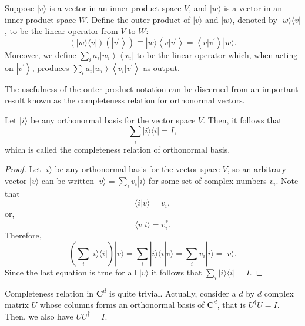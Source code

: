 

Suppose $|v\rangle$ is a vector in an inner product space $V$, and $|w\rangle$ is a vector in an inner product space $W$. Define the outer product of $|v\rangle$ and $|w\rangle$, denoted by $|w\rangle\langle v|$, to be the linear operator from $V$ to $W$:
$$
(|w\rangle\langle v|)\left(\left|v^{\prime}\right\rangle\right) \equiv|w\rangle\left\langle v | v^{\prime}\right\rangle=\left\langle v | v^{\prime}\right\rangle|w\rangle.
$$
Moreover, we define $\sum_{i} a_{i}\left|w_{i}\right\rangle\left\langle v_{i}\right|$ to be the linear operator which, when acting on $\left|v^{\prime}\right\rangle$, produces $\sum_{i} a_{i}\left|w_{i}\right\rangle\left\langle v_{i} | v^{\prime}\right\rangle$ as output.

The usefulness of the outer product notation can be discerned from an important result known as the completeness relation for orthonormal vectors. 

\begin{theorem}
    Let $|i\rangle$ be any orthonormal basis for the vector space $V$. Then, it follows that
$$
\sum_{i}|i\rangle\langle i|=I,
$$
which is called the completeness relation of orthonormal basis.
\end{theorem}
    
\begin{proof}
    Let $|i\rangle$ be any orthonormal basis for the vector space $V$, so an arbitrary vector $|v\rangle$ can be written $|v\rangle=\sum_{i} v_{i}|i\rangle$ for some set of complex numbers $v_{i}$. Note that
$$
\langle i | v\rangle=v_{i},
$$
or,
$$
\langle v | i\rangle=v_{i}^{*}.
$$
Therefore,
$$
\left(\sum_{i}|i\rangle\langle i|\right)|v\rangle=\sum_{i}|i\rangle\langle i | v\rangle=\sum_{i} v_{i}|i\rangle=|v\rangle.
$$
Since the last equation is true for all $|v\rangle$ it follows that $\sum_{i}|i\rangle\langle i|=I.$
\end{proof}
\begin{remark}
    Completeness relation in $\mathbf{C}^{d}$ is quite trivial. Actually, consider a $d$ by $d$ complex matrix $U$ whose columns forms an orthonormal basis of $\mathbf{C}^{d}$, that is $U^{\dagger}U= I.$ Then, we also have $UU^{\dagger}= I.$
\end{remark}

